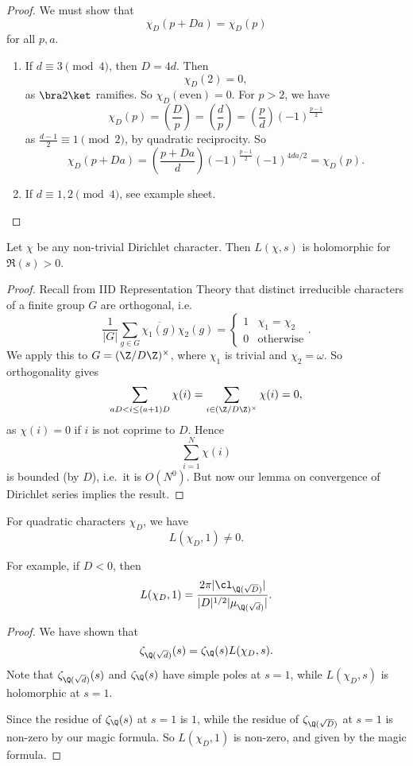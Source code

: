 \documentclass[a4paper]{article}
\begin{document}
\begin{proof}
  We must show that
  \[
    \chi_D(p + Da) = \chi_D(p)
  \]
  for all $p, a$.
  \begin{enumerate}
    \item If $d \equiv 3 \pmod 4$, then $D = 4d$. Then
      \[
        \chi_D(2) = 0,
      \]
      as $\bra 2\ket$ ramifies. So $\chi_D(\text{even}) = 0$. For $p > 2$, we have
      \[
        \chi_D(p) = \left(\frac{D}{p}\right) = \left(\frac{d}{p}\right) = \left(\frac{p}{d}\right) (-1)^{\frac{p - 1}{2}}
      \]
      as $\frac{d - 1}{2} \equiv 1 \pmod 2$, by quadratic reciprocity. So
      \[
        \chi_D(p + Da) = \left(\frac{p + Da}{d}\right) (-1)^{\frac{p - 1}{2}} (-1)^{4da/2} = \chi_D(p).
      \]
    \item If $d \equiv 1, 2\pmod 4$, see example sheet.
  \end{enumerate}
\end{proof}

\begin{lemma}
  Let $\chi$ be any non-trivial Dirichlet character. Then $L(\chi, s)$ is holomorphic for $\Re(s) > 0$.
\end{lemma}

\begin{proof}
  Recall from IID Representation Theory that distinct irreducible characters of a finite group $G$ are orthogonal, i.e.
  \[
    \frac{1}{|G|} \sum_{g \in G} \overline{\chi_1(g)} \chi_2(g) =
    \begin{cases}
      1 & \chi_1 = \chi_2\\
      0 & \text{otherwise}
    \end{cases}.
  \]
  We apply this to $G = (\Z/D\Z)^{\times}$, where $\chi_1$ is trivial and $\chi_2 = \omega$. So orthogonality gives
  \[
    \sum_{aD < i \leq (a + 1)D} \chi(i) = \sum_{i \in (\Z/D\Z)^\times} \chi(i) = 0,
  \]
  as $\chi(i) = 0$ if $i$ is not coprime to $D$. Hence
  \[
    \sum_{i = 1}^N \chi(i)
  \]
  is bounded (by $D$), i.e.\ it is $O(N^0)$. But now our lemma on convergence of Dirichlet series implies the result.
\end{proof}

\begin{cor}
  For quadratic characters $\chi_D$, we have
  \[
    L(\chi_D, 1) \not= 0.
  \]
\end{cor}
For example, if $D < 0$, then
\[
  L(\chi_D, 1) = \frac{2 \pi |\cl_{\Q(\sqrt{D})}|}{|D|^{1/2} |\mu_{\Q(\sqrt{d})}|}.
\]
\begin{proof}
  We have shown that
  \[
    \zeta_{\Q(\sqrt{d})}(s) = \zeta_{\Q}(s) L(\chi_D, s).
  \]
  Note that $\zeta_{\Q(\sqrt{d})}(s)$ and $\zeta_{\Q}(s)$ have simple poles at $s = 1$, while $L(\chi_D, s)$ is holomorphic at $s = 1$.

  Since the residue of $\zeta_{\Q}(s)$ at $s = 1$ is $1$, while the residue of $\zeta_{\Q(\sqrt{D})}$ at $s = 1$ is non-zero by our magic formula. So $L(\chi_D, 1)$ is non-zero, and given by the magic formula.
\end{proof}
\end{document}

